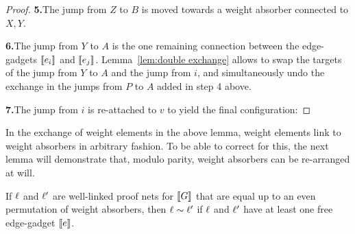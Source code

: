 \documentclass{lmcs}
\begin{document}
\begin{proof}
\displayOcto{\octorollC}

\noindent
\textbf{5.}\quad The jump from $Z$ to $B$ is moved towards a weight absorber connected to $X,Y$.


\noindent
\textbf{6.}\quad The jump from $Y$ to $A$ is the one remaining connection between the edge-gadgets $\llbracket e_i\rrbracket$ and $\llbracket e_j\rrbracket$. Lemma~\ref{lem:double exchange} allows to swap the targets of the jump from $Y$ to $A$ and the jump from $i$, and simultaneously undo the exchange in the jumps from $P$ to $A$ added in step 4 above.


\noindent
\textbf{7.}\quad The jump from $i$ is re-attached to $v$ to yield the final configuration:


\end{proof}

In the exchange of weight elements in the above lemma, weight elements link to weight absorbers in arbitrary fashion. To be able to correct for this, the next lemma will demonstrate that, modulo parity, weight absorbers can be re-arranged at will.

\begin{lemma}
\label{lem:permute weight absorbers}
If $\ell$ and $\ell'$ are well-linked proof nets for $\llbracket G\rrbracket$ that are equal up to an even permutation of weight absorbers, then $\links\perm\links'$ if $\ell$ and $\ell'$ have at least one free edge-gadget $\llbracket e\rrbracket$.
\end{lemma}
\end{document}
